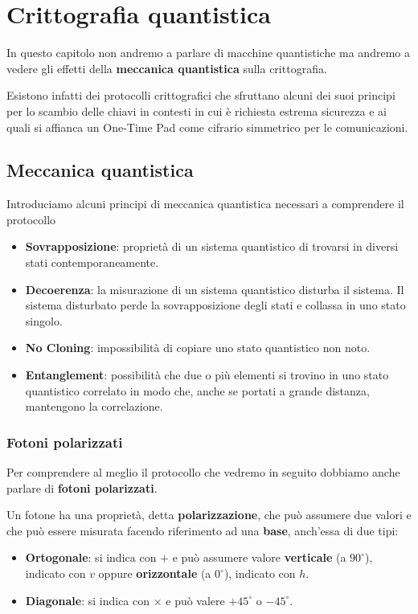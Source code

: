 \chapter{Crittografia quantistica}
In questo capitolo non andremo a parlare di macchine quantistiche ma andremo a vedere gli effetti della
\textbf{meccanica quantistica} sulla crittografia.

Esistono infatti dei protocolli crittografici che sfruttano alcuni dei suoi principi per lo scambio delle chiavi in
contesti in cui \`e richiesta estrema sicurezza e ai quali si affianca un One-Time Pad come cifrario simmetrico per
le comunicazioni.

\section{Meccanica quantistica}
Introduciamo alcuni principi di meccanica quantistica necessari a comprendere il protocollo
\begin{itemize}
	\item \textbf{Sovrapposizione}: propriet\`a di un sistema quantistico di trovarsi in diversi stati
	      contemporaneamente.
	\item \textbf{Decoerenza}: la misurazione di un sistema quantistico disturba il sistema. Il sistema disturbato
	      perde la sovrapposizione degli stati e collassa in uno stato singolo.
	\item \textbf{No Cloning}: impossibilit\`a di copiare uno stato quantistico non noto.
	\item \textbf{Entanglement}: possibilit\`a che due o pi\`u elementi si trovino in uno stato quantistico correlato
	      in modo che, anche se portati a grande distanza, mantengono la correlazione.
\end{itemize}

\subsection{Fotoni polarizzati}
Per comprendere al meglio il protocollo che vedremo in seguito dobbiamo anche parlare di \textbf{fotoni polarizzati}.

Un fotone ha una propriet\`a, detta \textbf{polarizzazione}, che pu\`o assumere due valori e che pu\`o essere misurata
facendo riferimento ad una \textbf{base}, anch'essa di due tipi:
\begin{itemize}
	\item \textbf{Ortogonale}: si indica con $+$ e pu\`o assumere valore \textbf{verticale} (a $90^\circ$), indicato con
	      $v$ oppure \textbf{orizzontale} (a $0^\circ$), indicato con $h$.
	\item \textbf{Diagonale}: si indica con $\times$ e pu\`o valere $+45^\circ$ o $-45^\circ$.
\end{itemize}

